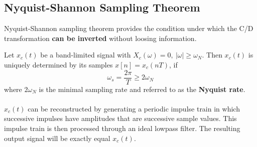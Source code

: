 \documentclass[12pt,a4paper]{article}
\begin{document}

\subsection{Nyquist-Shannon Sampling Theorem}
Nyquist-Shannon sampling theorem provides the condition under which the C/D transformation \textbf{can be inverted} without loosing information.\\
\begin{tcolorbox}
Let $x_{c}(t)$ be a band-limited signal with $X_{c}(\omega)=0, \ \lvert \omega \rvert \geq \omega_{N}$. Then $x_{c}(t)$ is uniquely determined by its samples $x[n] = x_{c}(nT)$, if 
\[ \omega_{s}=\frac{2\pi}{T} \geq 2\omega_{N} \]
where $2\omega_{N}$ is the minimal sampling rate and referred to as the \textbf{Nyquist rate}.
\\\\
$x_{c}(t)$ can be reconstructed by generating a periodic impulse train in which successive impulses have amplitudes that are successive sample values. This impulse train is then processed through an ideal lowpass filter. The resulting output signal will be exactly equal $x_{c}(t)$.
\end{tcolorbox}
\end{document}
